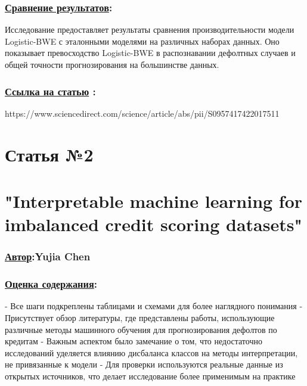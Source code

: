 \documentclass[a4paper,14pt]{article}
\begin{document}
\subsubsection*{\underline{Сравнение результатов}:}
Исследование предоставляет результаты сравнения производительности модели Logistic-BWE с эталонными моделями на различных наборах данных. Оно показывает превосходство Logistic-BWE в распознавании дефолтных случаев и общей точности прогнозирования на большинстве данных. 
\subsubsection*{\underline{Ссылка на статью} :}
https://www.sciencedirect.com/science/article/abs/pii/S0957417422017511


\newpage

\section*{Статья №2}
\section*{"Interpretable machine learning for imbalanced credit scoring datasets"}
\subsubsection*{\underline {Автор}:Yujia Chen}
\vspace{14pt}
\subsubsection*{\underline{Оценка содержания}:}
- Все шаги подкреплены таблицами и схемами для более наглядного понимания \newline
- Присутствует обзор литературы, где представлены работы, использующие различные \newline методы машинного обучения для прогнозирования дефолтов по кредитам \newline
- Важным аспектом было замечание о том, что недостаточно исследований уделяется \newline влиянию дисбаланса классов на методы интерпретации, не привязанные к модели \newline
- Для проверки используются реальные данные из открытых источников, что делает \newline исследование более применимым на практике
\end{document}
